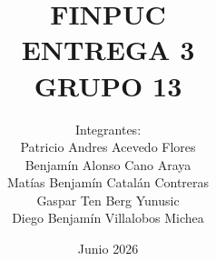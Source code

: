 \documentclass[pdftex,spanish]{pucthesis}	%
\begin{document}

\title[FINPUC \\ ENTREGA 3 \\ GRUPO 13]
   {\bf FINPUC \\ ENTREGA 3 \\ GRUPO 13}       
\author[Integrantes:]{Integrantes:\\
\textnormal{\small{
Patricio Andres Acevedo Flores\\
Benjamín Alonso Cano Araya\\
Matías Benjamín Catalán Contreras\\
Gaspar Ten Berg Yunusic\\
Diego Benjamín Villalobos Michea}
}
}

\address{Escuela de Ingenier\'ia\\
                   Pontificia Universidad Cat\'olica de Chile\\ 
                   Vicu\~na Mackenna 4860\\
                  Santiago, Chile\\
                  {\it Tel.\/} : 56 (2) 354-2000}


\date                                 {Junio 2026}


\NoChapterPageNumber
{}
\maketitle


\tableofcontents
{} \label{listoffigures}
\listoffigures
{} \label{listoftables}
\listoftables
\cleardoublepage
\end{document}
